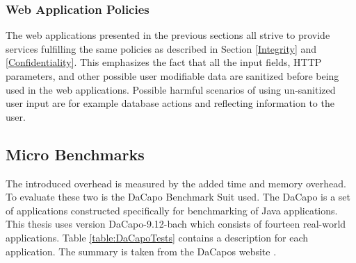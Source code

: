 \subsubsection{Web Application Policies}
The web applications presented in the previous sections all strive to provide services fulfilling the same policies as described in Section \ref{Integrity} and \ref{Confidentiality}. This emphasizes the fact that all the input fields, HTTP parameters, and other possible user modifiable data are sanitized before being used in the web applications. Possible harmful scenarios of using un-sanitized user input are for example database actions and reflecting information to the user.



\subsection{Micro Benchmarks}
The introduced overhead is measured by the added time and memory overhead. To evaluate these two is the DaCapo Benchmark Suit \parencite{dacapo} used. The DaCapo is a set of applications constructed specifically for benchmarking of Java applications. This thesis uses version DaCapo-9.12-bach which consists of fourteen real-world applications. Table \ref{table:DaCapoTests} contains a description for each application. The summary is taken from the DaCapos website \parencite{dacapoBench}.

